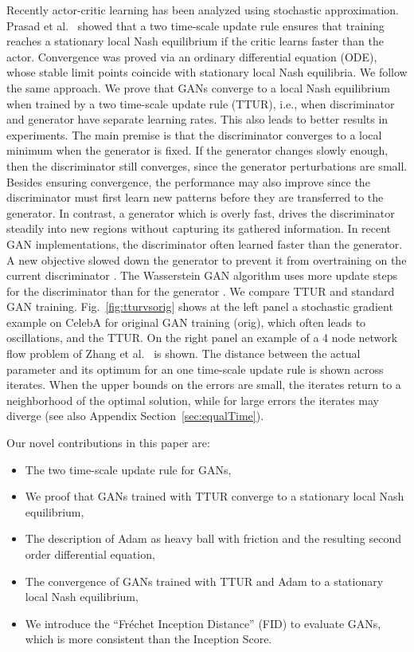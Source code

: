 \documentclass{article}
\begin{document}
Recently actor-critic learning has been analyzed using stochastic approximation.
Prasad et al.\ \cite{Prasad:15} showed that
a two time-scale update rule ensures that training reaches a
stationary local Nash equilibrium if the critic learns
faster than the actor.
Convergence was proved via an ordinary
differential equation (ODE), whose stable limit points coincide with stationary
local Nash equilibria. We follow the same approach.
We prove that GANs converge to a local Nash equilibrium when trained by a two
time-scale update rule (TTUR), i.e., when discriminator and generator have
separate learning rates. This also leads to better results in experiments.
The main premise is that the discriminator converges to a local minimum when the
generator is fixed. If the generator changes slowly enough, then the
discriminator still converges, since the generator perturbations are
small.
Besides ensuring convergence, the performance may also improve since the
discriminator must first learn new patterns before they are transferred to the
generator. In contrast, a generator which is overly fast, drives the
discriminator steadily into new regions without capturing its
gathered information.
In recent GAN implementations, the discriminator often learned faster than the
generator. A new objective slowed down the generator to prevent it from
overtraining on the current discriminator \cite{Salimans:16}.
The Wasserstein GAN algorithm uses more update steps for the discriminator than
for the generator \cite{Arjovsky:17}. We compare
TTUR and standard GAN training.
Fig.~\ref{fig:tturvsorig} shows at the left panel a stochastic gradient
example on CelebA for original GAN training (orig), which often leads to
oscillations, and the TTUR. On the right panel an example of a 4 node network
flow problem of Zhang et al.\ \cite{Zhang:07} is shown.
The distance between the actual parameter and its optimum for an one time-scale
update rule is shown across iterates. When the upper bounds on the errors are
small, the iterates return to a neighborhood of the optimal solution, while for
large errors the iterates may diverge (see also Appendix
Section~\ref{sec:equalTime}).

Our novel contributions in this paper are:

\begin{itemize}
\item The two time-scale update rule for GANs,
\item We proof that GANs trained with TTUR converge to a
stationary local Nash equilibrium,
\item The description of Adam as heavy ball with friction and the
  resulting second order differential equation,
\item The convergence of GANs trained with TTUR and Adam to a
stationary local Nash equilibrium,
\item We introduce the ``Fr\'{e}chet Inception Distance'' (FID) to evaluate
GANs, which is more consistent than the Inception Score.
\end{itemize}
\end{document}
